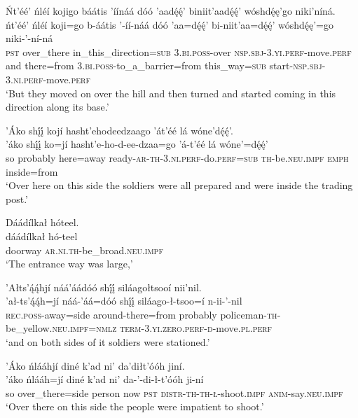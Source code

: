 \ea\label{ex:text1-61-7}
Ńt’éé’ ńléí kojigo báátis ’íínáá dóó ’aadę́ę́’ biniit’aadę́ę́’ wóshdę́ę’go niki’níná.\\
\gll ńt’éé’	ńléí	koji=go	b-áátis	’-íí-náá	dóó	’aa=dę́ę́’	bi-niit’aa=dę́ę́’	wóshdę́ę’=go	niki-’-ní-ná\\
     \textsc{pst}	over\_there	in\_this\_direction=\textsc{sub}	3.\textsc{bi}.\textsc{poss}-over	\textsc{nsp}.\textsc{sbj}-3.\textsc{yi}.\textsc{perf}-move.\textsc{perf}	and	there=from	3.\textsc{bi}.\textsc{poss}-to\_a\_barrier=from	this\_way=\textsc{sub}	start-\textsc{nsp}.\textsc{sbj}-3.\textsc{ni}.\textsc{perf}-move.\textsc{perf}\\
\glt `But they moved on over the hill and then turned and started coming in this direction along its base.'
\z

\ea\label{ex:text1-61-8}
’Áko shį́į́ kojí hasht’ehodeedzaago ’át’éé lá wóne’dę́ę́’.\\
\gll ’áko	shį́į́	ko=jí	hasht’e-ho-d-ee-dzaa=go	’á-t’éé	lá	wóne’=dę́ę́’\\
     so	probably	here=away	ready-\textsc{ar}-\textsc{th}-3.\textsc{ni}.\textsc{perf}-do.\textsc{perf}=\textsc{sub}	\textsc{th}-be.\textsc{neu}.\textsc{impf}	\textsc{emph}	inside=from\\
\glt `Over here on this side the soldiers were all prepared and were inside the trading post.'
\z

\ea\label{ex:text1-61-9}
Dáádílkał hóteel.\\
\gll dáádílkał	hó-teel\\
     doorway	\textsc{ar}.\textsc{ni}.\textsc{th}-be\_broad.\textsc{neu}.\textsc{impf}\\
\glt `The entrance way was large,'
\z

\ea\label{ex:text1-61-10}
’Ałts’ą́ą́hjí náá’áádóó shį́į́ siláagołtsooí nii’nil.\\
\gll ’ał-ts’ą́ą́h=jí	náá-’áá=dóó	shį́į́	siláago-ł-tsoo=í	n-ii-’-nil\\
     \textsc{rec}.\textsc{poss}-away=side	around-there=from	probably	policeman-\textsc{th}-be\_yellow.\textsc{neu}.\textsc{impf}=\textsc{nmlz}	\textsc{term}-3.\textsc{yi}.\textsc{zero}.\textsc{perf}-\textsc{d}-move.\textsc{pl}.\textsc{perf}\\
\glt `and on both sides of it soldiers were stationed.'
\z

\ea\label{ex:text1-61-11}
’Áko ńlááhjí diné k’ad ni’ da’diłt’óóh jiní.\\
\gll ’áko	ńlááh=jí	diné	k’ad	ni’	da-’-di-ł-t’óóh	ji-ní\\
     so	over\_there=side	person	now	\textsc{pst}	\textsc{distr}-\textsc{th}-\textsc{th}-\textsc{ł}-shoot.\textsc{impf}	\textsc{anim}-say.\textsc{neu}.\textsc{impf}\\
\glt `Over there on this side the people were impatient to shoot.'
\z

